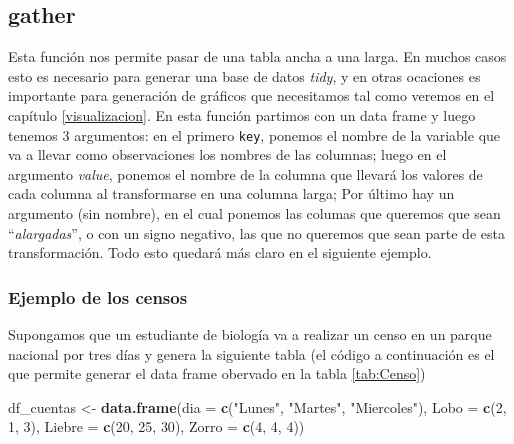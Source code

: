 \documentclass[]{book}
\newenvironment{Shaded}{\begin{snugshade}}{\end{snugshade}}
\newcommand{\DataTypeTok}[1]{\textcolor[rgb]{0.13,0.29,0.53}{#1}}
\newcommand{\DecValTok}[1]{\textcolor[rgb]{0.00,0.00,0.81}{#1}}
\newcommand{\KeywordTok}[1]{\textcolor[rgb]{0.13,0.29,0.53}{\textbf{#1}}}
\newcommand{\NormalTok}[1]{#1}
\newcommand{\StringTok}[1]{\textcolor[rgb]{0.31,0.60,0.02}{#1}}
\begin{document}
\hypertarget{gather}{%
\subsection{gather}\label{gather}}

Esta función nos permite pasar de una tabla ancha a una larga. En muchos
casos esto es necesario para generar una base de datos \emph{tidy}, y en
otras ocaciones es importante para generación de gráficos que
necesitamos tal como veremos en el capítulo \ref{visualizacion}. En esta
función partimos con un data frame y luego tenemos 3 argumentos: en el
primero \texttt{key}, ponemos el nombre de la variable que va a llevar
como observaciones los nombres de las columnas; luego en el argumento
\emph{value}, ponemos el nombre de la columna que llevará los valores de
cada columna al transformarse en una columna larga; Por último hay un
argumento (sin nombre), en el cual ponemos las columas que queremos que
sean ``\emph{alargadas}'', o con un signo negativo, las que no queremos
que sean parte de esta transformación. Todo esto quedará más claro en el
siguiente ejemplo.

\hypertarget{ejemplo-de-los-censos}{%
\subsubsection{Ejemplo de los censos}\label{ejemplo-de-los-censos}}

Supongamos que un estudiante de biología va a realizar un censo en un
parque nacional por tres días y genera la siguiente tabla (el código a
continuación es el que permite generar el data frame obervado en la
tabla \ref{tab:Censo})

\begin{Shaded}
\begin{Highlighting}[]
\NormalTok{df_cuentas <-}\StringTok{ }\KeywordTok{data.frame}\NormalTok{(}\DataTypeTok{dia =} \KeywordTok{c}\NormalTok{(}\StringTok{"Lunes"}\NormalTok{, }\StringTok{"Martes"}\NormalTok{, }\StringTok{"Miercoles"}\NormalTok{), }
    \DataTypeTok{Lobo =} \KeywordTok{c}\NormalTok{(}\DecValTok{2}\NormalTok{, }\DecValTok{1}\NormalTok{, }\DecValTok{3}\NormalTok{), }\DataTypeTok{Liebre =} \KeywordTok{c}\NormalTok{(}\DecValTok{20}\NormalTok{, }\DecValTok{25}\NormalTok{, }\DecValTok{30}\NormalTok{), }\DataTypeTok{Zorro =} \KeywordTok{c}\NormalTok{(}\DecValTok{4}\NormalTok{, }\DecValTok{4}\NormalTok{, }
        \DecValTok{4}\NormalTok{))}
\end{Highlighting}
\end{Shaded}
\end{document}
